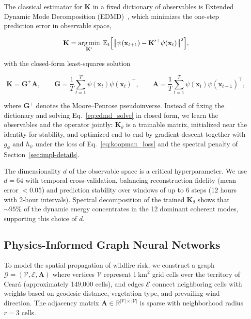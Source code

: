 \documentclass[preprint,12pt,times,numbers]{elsarticle}
\begin{document}
The classical estimator for $\mathbf{K}$ in a fixed dictionary of observables is Extended Dynamic Mode Decomposition (EDMD)~\cite{article:williams2015}, which minimizes the one-step prediction error in observable space,

\begin{equation}
\mathbf{K} = \operatorname*{arg\,min}_{\mathbf{K}'} \; \mathbb{E}_{t}\Bigl[ \bigl\| \psi(\mathbf{x}_{t+1}) - \mathbf{K}'^{\top} \psi(\mathbf{x}_t) \bigr\|^2 \Bigr],
\label{eq:edmd_obj}
\end{equation}

with the closed-form least-squares solution

\begin{equation}
\mathbf{K} = \mathbf{G}^{+} \mathbf{A}, \qquad
\mathbf{G} = \frac{1}{T}\sum_{t=1}^{T} \psi(\mathbf{x}_t)\psi(\mathbf{x}_t)^{\top}, \qquad
\mathbf{A} = \frac{1}{T}\sum_{t=1}^{T} \psi(\mathbf{x}_t)\psi(\mathbf{x}_{t+1})^{\top},
\label{eq:edmd_solve}
\end{equation}

where $\mathbf{G}^{+}$ denotes the Moore--Penrose pseudoinverse. Instead of fixing the dictionary and solving Eq.~\eqref{eq:edmd_solve} in closed form, we learn the observables and the operator jointly: $\mathbf{K}_\theta$ is a trainable matrix, initialized near the identity for stability, and optimized end-to-end by gradient descent together with $g_\phi$ and $h_\psi$ under the loss of Eq.~\eqref{eq:koopman_loss} and the spectral penalty of Section~\ref{sec:impl-details}.

The dimensionality $d$ of the observable space is a critical hyperparameter. We use $d = 64$ with temporal cross-validation, balancing reconstruction fidelity (mean error $< 0.05$) and prediction stability over windows of up to 6 steps (12 hours with 2-hour intervals). Spectral decomposition of the trained $\mathbf{K}_\theta$ shows that ${\sim}95\%$ of the dynamic energy concentrates in the 12 dominant coherent modes, supporting this choice of $d$.

\subsection{Physics-Informed Graph Neural Networks}
\label{sec:pignn}

To model the spatial propagation of wildfire risk, we construct a graph $\mathcal{G} = (\mathcal{V}, \mathcal{E}, \mathbf{A})$ where vertices $\mathcal{V}$ represent $1\ \text{km}^2$ grid cells over the territory of Ceará (approximately 149{,}000 cells), and edges $\mathcal{E}$ connect neighboring cells with weights based on geodesic distance, vegetation type, and prevailing wind direction. The adjacency matrix $\mathbf{A} \in \mathbb{R}^{|\mathcal{V}| \times |\mathcal{V}|}$ is sparse with neighborhood radius $r = 3$ cells.
\end{document}
